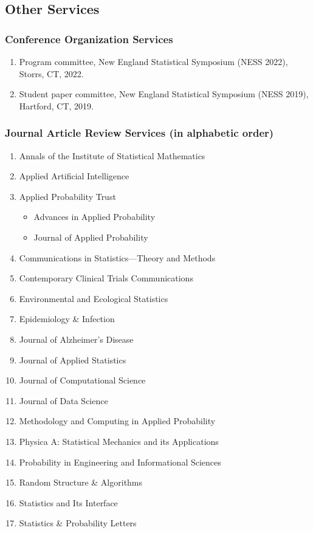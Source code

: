 \documentclass{res}
\begin{document}
\begin{resume}
\section{Other Services}

\subsubsection{Conference Organization Services}
\begin{enumerate}
	\item Program committee, New England Statistical Symposium (NESS 
	2022), Storrs, CT, 2022.
	\item Student paper committee, New England Statistical Symposium 
	(NESS 2019), Hartford, CT, 2019.
\end{enumerate}

\subsubsection{Journal Article Review Services (in alphabetic order)}
\begin{enumerate}
	\item Annals of the Institute of Statistical Mathematics
	\item Applied Artificial Intelligence
	\item Applied Probability Trust
	\begin{itemize}
		\item Advances in Applied Probability 
		\item Journal of Applied Probability
	\end{itemize}
	\item Communications in Statistics---Theory and Methods
	\item Contemporary Clinical Trials Communications
	\item Environmental and Ecological Statistics
	\item Epidemiology \& Infection
	\item Journal of Alzheimer's Disease
	\item Journal of Applied Statistics
	\item Journal of Computational Science 
	\item Journal of Data Science
	\item Methodology and Computing in Applied Probability
	\item Physica A: Statistical Mechanics and its Applications
	\item Probability in Engineering and Informational Sciences
	\item Random Structure \& Algorithms
	\item Statistics and Its Interface
	\item Statistics \& Probability Letters
\end{enumerate}


\end{resume}
\end{document}
